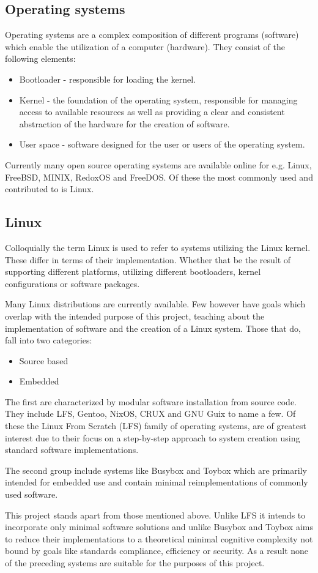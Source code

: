 \subsection{Operating systems}

Operating systems are a complex composition of different programs (software) which enable the utilization of a computer (hardware). They consist of the following elements:

\begin{itemize}
    \item Bootloader - responsible for loading the kernel.
    \item Kernel - the foundation of the operating system, responsible for managing access to available resources as well as providing a clear and consistent abstraction of the hardware for the creation of software.
    \item User space - software designed for the user or users of the operating system.
\end{itemize}

Currently many open source operating systems are available online for e.g. Linux, FreeBSD, MINIX, RedoxOS and FreeDOS. Of these the most commonly used and contributed to is Linux.

\subsection{Linux}

Colloquially the term Linux is used to refer to systems utilizing the Linux kernel. These differ in terms of their implementation. Whether that be the result of supporting different platforms, utilizing different bootloaders, kernel configurations or software packages.

Many Linux distributions are currently available. Few however have goals which overlap with the intended purpose of this project, teaching about the implementation of software and the creation of a Linux system. Those that do, fall into two categories:

\begin{itemize}
    \item Source based
    \item Embedded
\end{itemize}

The first are characterized by modular software installation from source code. They include LFS, Gentoo, NixOS, CRUX and GNU Guix to name a few. Of these the Linux From Scratch (LFS) family of operating systems, are of greatest interest due to their focus on a step-by-step approach to system creation using standard software implementations. 

The second group include systems like Busybox and Toybox which are primarily intended for embedded use and contain minimal reimplementations of commonly used software.

This project stands apart from those mentioned above. Unlike LFS it intends to incorporate only minimal software solutions and unlike Busybox and Toybox aims to reduce their implementations to a theoretical minimal cognitive complexity not bound by goals like standards compliance, efficiency or security. As a result none of the preceding systems are suitable for the purposes of this project.
